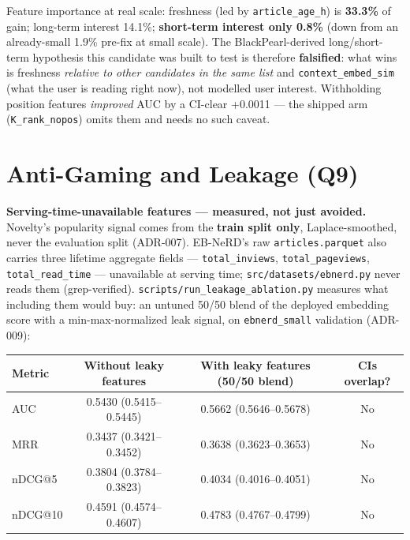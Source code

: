 \documentclass[10.5pt]{article}
\begin{document}
Feature importance at real scale: freshness (led by \texttt{article\_age\_h})
is \textbf{33.3\%} of gain; long-term interest 14.1\%; \textbf{short-term
interest only 0.8\%} (down from an already-small 1.9\% pre-fix at
small scale). The BlackPearl-derived long/short-term hypothesis this
candidate was built to test is therefore \textbf{falsified}: what wins is
freshness \emph{relative to other candidates in the same list} and
\texttt{context\_embed\_sim} (what the user is reading right now), not
modelled user interest. Withholding position features \emph{improved} AUC
by a CI-clear +0.0011 --- the shipped arm (\texttt{K\_rank\_nopos}) omits
them and needs no such caveat.

\section{Anti-Gaming and Leakage (Q9)}

\begin{sloppypar}
\textbf{Serving-time-unavailable features --- measured, not just avoided.}
Novelty's popularity signal comes from the \textbf{train split only},
Laplace-smoothed, never the evaluation split (ADR-007). EB-NeRD's raw
\texttt{articles.parquet} also carries three lifetime aggregate fields
--- \texttt{total\_inviews}, \texttt{total\_pageviews},
\texttt{total\_read\_time} --- unavailable at serving time;
\texttt{src/datasets/ebnerd.py} never reads them (grep-verified).
\texttt{scripts/run\_leakage\_ablation.py} measures what including them
would buy: an untuned 50/50 blend of the deployed embedding score with a
min-max-normalized leak signal, on \texttt{ebnerd\_small} validation
(ADR-009):
\end{sloppypar}

{\footnotesize
\begin{tabular}{@{}lccc@{}}
\toprule
Metric & Without leaky features & With leaky features (50/50 blend) & CIs overlap? \\
\midrule
AUC & 0.5430 (0.5415--0.5445) & 0.5662 (0.5646--0.5678) & No \\
MRR & 0.3437 (0.3421--0.3452) & 0.3638 (0.3623--0.3653) & No \\
nDCG@5 & 0.3804 (0.3784--0.3823) & 0.4034 (0.4016--0.4051) & No \\
nDCG@10 & 0.4591 (0.4574--0.4607) & 0.4783 (0.4767--0.4799) & No \\
\bottomrule
\end{tabular}\par}
\end{document}
